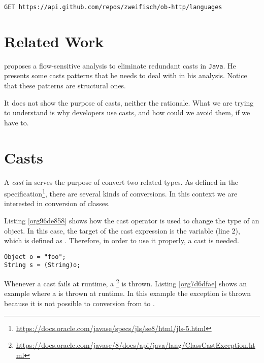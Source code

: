 \lstset{language=http,label= ,caption= ,captionpos=b,numbers=none}
\begin{lstlisting}
GET https://api.github.com/repos/zweifisch/ob-http/languages
\end{lstlisting}

\section{Related Work}
\label{sec:org255eb70}
\cite{winther_guarded_2011} proposes a flow-sensitive analysis to eliminate
redundant casts in \texttt{Java}.
He presents some casts patterns that he needs to deal with in his analysis.
Notice that these patterns are structural ones.

\cite{staicu_understanding_2017}

\cite{buse_synthesizing_2012}

It does not show the purpose of casts, neither the rationale.
What we are trying to understand is why developers use casts,
and how could we avoid them, if we have to.

\section{Casts \label{org9cc9cb6}}
\label{sec:org6ed331e}
A \emph{cast} in \java{} serves the purpose of convert two related types. 
As defined in the \java{} specification\footnote{\url{https://docs.oracle.com/javase/specs/jls/se8/html/jls-5.html}}, there are several kinds of conversions. 
In this context we are interested in conversion of classes. 

Listing \ref{org96de858} shows how the cast operator is used to change the type of an object. 
In this case, the target of the cast expression is the variable  (line 2), which is defined as . 
Therefore, in order to use it properly, a cast is needed. 

\begin{lstlisting}
Object o = "foo"; 
String s = (String)o; 
\end{lstlisting}

Whenever a cast fails at runtime, a \cce{} \footnote{\url{https://docs.oracle.com/javase/8/docs/api/java/lang/ClassCastException.html}} is thrown. 
Listing \ref{org7d6dfae} shows an example where a \cce{} is thrown at runtime. 
In this example the exception is thrown because it is not possible to conversion from  to . 


